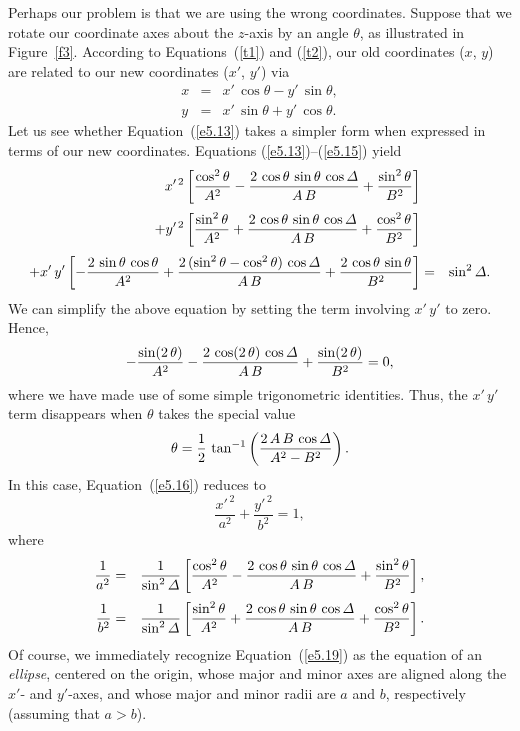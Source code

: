 Perhaps our problem is that we are using the wrong coordinates.
Suppose that we rotate our coordinate axes about the $z$-axis by an
angle $\theta$, as illustrated in Figure~\ref{f3}. According to Equations~(\ref{t1}) and (\ref{t2}), our old coordinates  ($x$, $y$) are related to our new coordinates
($x'$, $y'$) via
\begin{eqnarray}
x&=& x'\,\cos\theta - y'\,\sin \theta,\label{e5.14}\\[0.5ex]
y &=& x'\,\sin\theta + y'\,\cos\theta.\label{e5.15}
\end{eqnarray}
Let us see whether Equation~(\ref{e5.13}) takes a simpler form when expressed
in terms of our new coordinates. Equations (\ref{e5.13})--(\ref{e5.15})
yield
\begin{eqnarray}
x'^{\,2}\left[\frac{\cos^2\theta}{A^2} - \frac{2\,\cos\theta\,\sin\theta\,\cos{\mit\Delta}}{A\,B} + \frac{\sin^2\theta}{B^2}\right]&&\nonumber\\[0.5ex]
+ y'^{\,2}\left[\frac{\sin^2\theta}{A^2} +\frac{2\,\cos\theta\,\sin\theta\,\cos{\mit\Delta}}{A\,B} + \frac{\cos^2\theta}{B^2}\right]&&\label{e5.16}\\[0.5ex]
+x' \,y'\left[-\frac{2\,\sin\theta\,\cos\theta}{A^2} + \frac{2\,(\sin^2\theta-\cos^2\theta)\,\cos{\mit\Delta}}{A\,B} + \frac{2\,\cos\theta\,\sin\theta}{B^2}\right] &=& \sin^2{\mit\Delta}.\nonumber
\end{eqnarray}
We can simplify the above equation by setting the term involving $x' \,y'$ to
zero. Hence,
\begin{equation}
-\frac{\sin (2\,\theta)}{A^2}  - \frac{2\,\cos (2\,\theta)\,\cos{\mit\Delta}}{A\,B} + \frac{\sin (2\,\theta)}{B^2}= 0,
\end{equation}
where we have made use of some simple trigonometric identities. Thus, the $x' \,y'$ term disappears when $\theta$ takes the special value
\begin{equation}
\theta = \frac{1}{2}\,\tan^{-1}\left(\frac{2\,A\,B\,\cos{\mit\Delta}}{A^2-B^2}\right).
\end{equation}
In this case, Equation~(\ref{e5.16}) reduces to
\begin{equation}\label{e5.19}
\frac{x'^{\,2}}{a^2} + \frac{y'^{\,2}}{b^2} = 1,
\end{equation}
where
\begin{eqnarray}
\frac{1}{a^2}& =& \frac{1}{\sin^2{\mit\Delta}}\left[\frac{\cos^2\theta}{A^2} - \frac{2\,\cos\theta\,\sin\theta\,\cos{\mit\Delta}}{A\,B} + \frac{\sin^2\theta}{B^2}\right],\\[0.5ex]
\frac{1}{b^2}& =& \frac{1}{\sin^2{\mit\Delta}}\left[\frac{\sin^2\theta}{A^2} +\frac{2\,\cos\theta\,\sin\theta\,\cos{\mit\Delta}}{A\,B} + \frac{\cos^2\theta}{B^2}\right].
\end{eqnarray}
Of course, we immediately recognize Equation~(\ref{e5.19}) as the equation of
an {\em ellipse}, centered on the origin, whose major and minor axes are aligned along the
$x'$- and $y'$-axes, and whose major and minor radii are $a$ and $b$,
respectively (assuming that $a>b$). 


